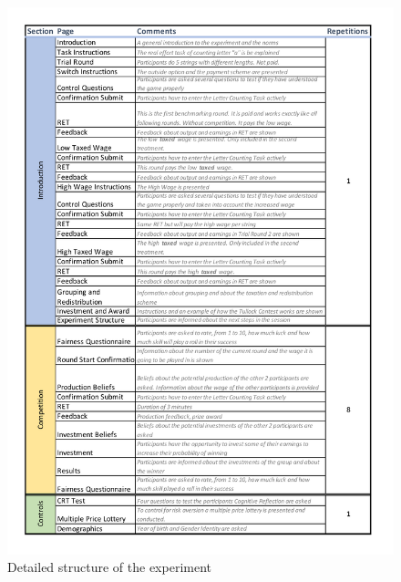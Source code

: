 \begin{appendices}
    \begin{figure}
        \centering
        \includegraphics[width=\textwidth]{graphs/Experimental_Design.pdf}
        \caption{Detailed structure of the experiment}
        \label{tab:exp_design}
    \end{figure}

\end{appendices}